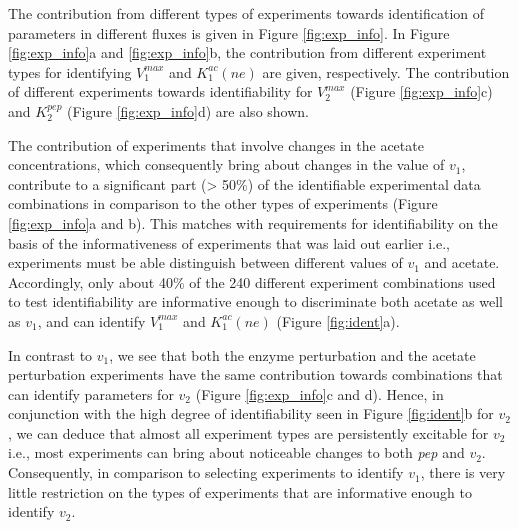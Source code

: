 \documentclass[10pt]{article}
\begin{document}
	The contribution from different types of experiments towards identification of parameters in different fluxes is given in Figure \ref{fig:exp_info}. In Figure \ref{fig:exp_info}a and \ref{fig:exp_info}b, the contribution from different experiment types for identifying $V_1^{max}$ and $K_1^{ac}(ne)$ are given, respectively. The contribution of different experiments towards identifiability for $V_2^{max}$ (Figure \ref{fig:exp_info}c) and $K_2^{pep}$ (Figure \ref{fig:exp_info}d) are also shown.	
	
	The contribution of experiments that involve changes in the acetate concentrations, which consequently bring about changes in the value of $v_1$, contribute to a significant part (> 50\%) of the identifiable experimental data combinations in comparison to the other types of experiments (Figure \ref{fig:exp_info}a and b). This matches with requirements for identifiability on the basis of the informativeness of experiments that was laid out earlier i.e., experiments must be able distinguish between different values of $v_1$ and acetate. Accordingly, only about 40\% of the 240 different experiment combinations used to test identifiability are informative enough to discriminate both acetate as well as $v_1$, and can identify $V_1^{max}$ and $K_1^{ac}(ne)$ (Figure \ref{fig:ident}a). 	
	
	In contrast to $v_1$, we see that both the enzyme perturbation and the acetate perturbation experiments have the same contribution towards combinations that can identify parameters for $v_2$ (Figure \ref{fig:exp_info}c and d). Hence, in conjunction with the high degree of identifiability seen in Figure \ref{fig:ident}b for $v_2$, we can deduce that almost all experiment types are persistently excitable for $v_2$ i.e., most experiments can bring about noticeable changes to both \textit{pep} and $v_2$. Consequently, in comparison to selecting experiments to identify $v_1$, there is very little restriction on the types of experiments that are informative enough to identify $v_2$. %
	
\end{document}

